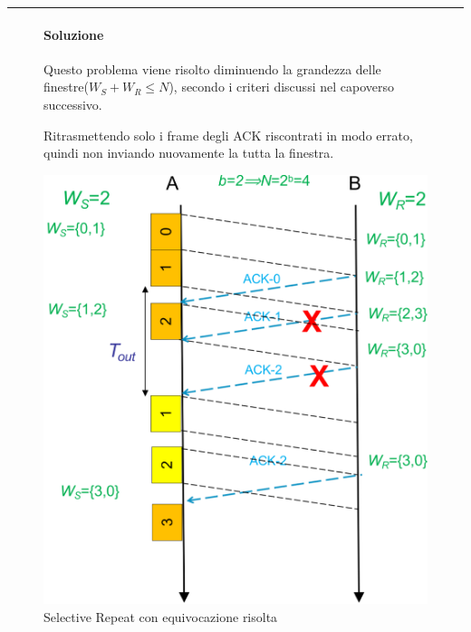\vspace{1em}
\noindent\rule{\linewidth}{0.4pt}
\vspace{1em}


\begin{figure}[htbp]
    \centering
    \begin{minipage}{0.48\textwidth}
        \paragraph{Soluzione}
        Questo problema viene risolto diminuendo la grandezza delle finestre($W_S + W_R \leq N$), secondo i criteri discussi nel capoverso successivo.

        Ritrasmettendo solo i frame degli ACK riscontrati in modo errato, quindi non inviando nuovamente la tutta la finestra.
    \end{minipage}%
    \hfill
    \begin{minipage}{0.435\textwidth}
        \includegraphics[width=\linewidth]{images/equivocazionesr.png}
        \caption{Selective Repeat con equivocazione risolta}
    \end{minipage}
\end{figure}

